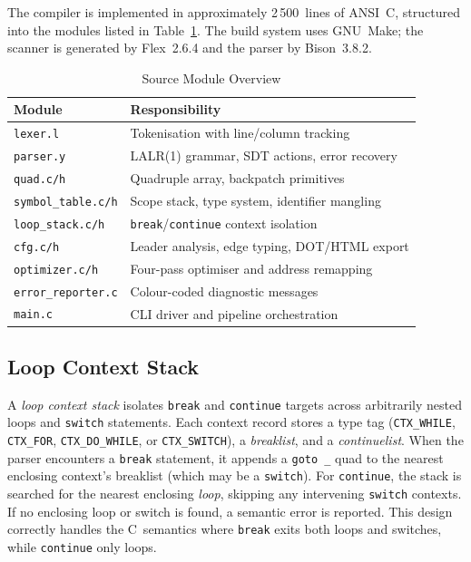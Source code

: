 \documentclass[conference]{IEEEtran}
\begin{document}
The compiler is implemented in approximately 2\,500~lines of ANSI~C, structured into the modules listed in Table~\ref{tab:modules}. The build system uses GNU~Make; the scanner is generated by Flex~2.6.4 and the parser by Bison~3.8.2.

\begin{table}[t]
\centering
\caption{Source Module Overview}
\label{tab:modules}
\footnotesize
\begin{tabular}{@{}ll@{}}
\toprule
\textbf{Module} & \textbf{Responsibility}\\
\midrule
\texttt{lexer.l}          & Tokenisation with line/column tracking\\
\texttt{parser.y}         & LALR(1) grammar, SDT actions, error recovery\\
\texttt{quad.c/h}         & Quadruple array, backpatch primitives\\
\texttt{symbol\_table.c/h} & Scope stack, type system, identifier mangling\\
\texttt{loop\_stack.c/h}   & \texttt{break}/\texttt{continue} context isolation\\
\texttt{cfg.c/h}          & Leader analysis, edge typing, DOT/HTML export\\
\texttt{optimizer.c/h}    & Four-pass optimiser and address remapping\\
\texttt{error\_reporter.c} & Colour-coded diagnostic messages\\
\texttt{main.c}           & CLI driver and pipeline orchestration\\
\bottomrule
\end{tabular}
\end{table}

\subsection{Loop Context Stack}
A \emph{loop context stack} isolates \texttt{break} and \texttt{continue} targets across arbitrarily nested loops and \texttt{switch} statements. Each context record stores a type tag (\texttt{CTX\_WHILE}, \texttt{CTX\_FOR}, \texttt{CTX\_DO\_WHILE}, or \texttt{CTX\_SWITCH}), a \emph{breaklist}, and a \emph{continuelist}. When the parser encounters a \texttt{break} statement, it appends a \texttt{goto \_} quad to the nearest enclosing context's breaklist (which may be a \texttt{switch}). For \texttt{continue}, the stack is searched for the nearest enclosing \emph{loop}, skipping any intervening \texttt{switch} contexts. If no enclosing loop or switch is found, a semantic error is reported. This design correctly handles the C~semantics where \texttt{break} exits both loops and switches, while \texttt{continue} only loops.
\end{document}
